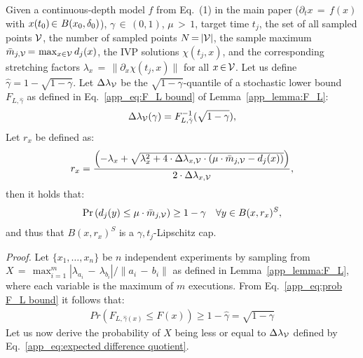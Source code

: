 %
\begin{theorem}\label{app_thm:lipschitz cap}
    Given a continuous-depth model $f$ from Eq.~(1) in the main paper ($\partial_t x\,{=}\,f(x)$ with $x(t_0)\,{\in}\,\,B(x_0, \delta_0)$), $\gamma\,{\in}\,(0,1)$, $\mu\,{>}\,1$, target time $t_j$,
    the set of all sampled points $\mathcal{V}$, the number of sampled points $N\,{=}\,|\mathcal{V}|$, the sample maximum $\bar{m}_{j,\mathcal{V}}\,{=}\,\max_{x\in\mathcal{V}} d_j(x)$, the IVP solutions $\chi(t_j,x)$, and the corresponding stretching factors $\lambda_x\,{=}\,\|\partial_x\chi(t_j,x)\|$ for all $x\,{\in}\,\mathcal{V}$. Let us define $\hat{\gamma} = 1-\sqrt{1-\gamma}$.
    Let $\Delta\lambda_{\mathcal{V}}$ be the $\sqrt{1-\gamma}$-quantile of a stochastic lower bound $F_{L,\hat{\gamma}}$ as defined in Eq.~\eqref{app_eq:F_L bound} of Lemma~\ref{app_lemma:F_L}:
    \begin{align}\label{app_eq:expected difference quotient}
        \Delta\lambda_{\mathcal{V}}(\gamma) = F_{L,\hat{\gamma}}^{-1}(\sqrt{1-\gamma}),
    \end{align}
    Let $r_x$ be defined as:
    \begin{align}\label{app_eq:cap radius}
        r_{x} = \frac{\left(-\lambda_x + \sqrt{\lambda_x^2 + 4\cdot\Delta\lambda_{x,\mathcal{V}}\cdot(\mu\cdot\bar{m}_{j,\mathcal{V}}-d_j(x))}\right)}{2\cdot\Delta\lambda_{x,\mathcal{V}}},
    \end{align}
    then it holds that:
    \begin{align}\label{app_eq:cap probability}
        \Pr\left(d_j(y) \le \mu\cdot \bar{m}_{j,\mathcal{V}}\right)\ge 1-\gamma\quad \forall y\in B(x,r_x)^S,
    \end{align}
    and thus that $B(x, r_x)^S$ is a $\gamma, t_j$-Lipschitz cap.
\end{theorem}
\emph{Proof.} Let $\{x_1,\dots,x_n\}$ be $n$ independent experiments by sampling from $X\,{=}\,\max_{i=1}^m|\lambda_{a_i}\,{-}\,\lambda_{b_i}|/\|a_i\,{-}\,b_i\|$ as defined in Lemma~\ref{app_lemma:F_L}, where each variable is the maximum of $m$ executions. 
From Eq.~\eqref{app_eq:prob F_L bound} it follows that:
\begin{align}\label{app_eq:cdf bound}
    Pr(F_{L,\hat{\gamma}(x)} \le F(x))\ge 1-\hat{\gamma} = \sqrt{1-\gamma}
\end{align}
Let us now derive the probability of $X$ being less or equal to $\Delta\lambda_{\mathcal{V}}$ defined by Eq.~\eqref{app_eq:expected difference quotient}. 
